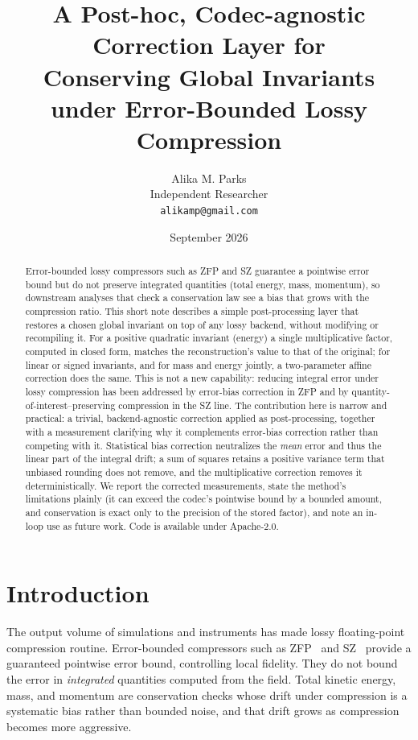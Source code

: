 \documentclass[11pt]{article}
\title{A Post-hoc, Codec-agnostic Correction Layer for\\
Conserving Global Invariants under Error-Bounded Lossy Compression}
\author{Alika M. Parks\\
\small Independent Researcher \\
\small \texttt{alikamp@gmail.com}}
\date{September 2026}
\begin{document}
\maketitle

\begin{abstract}
Error-bounded lossy compressors such as ZFP and SZ guarantee a pointwise error
bound but do not preserve integrated quantities (total energy, mass, momentum),
so downstream analyses that check a conservation law see a bias that grows with
the compression ratio. This short note describes a simple post-processing layer
that restores a chosen global invariant on top of any lossy backend, without
modifying or recompiling it. For a positive quadratic invariant (energy) a
single multiplicative factor, computed in closed form, matches the
reconstruction's value to that of the original; for linear or signed invariants,
and for mass and energy jointly, a two-parameter affine correction does the
same. This is not a new capability: reducing integral error under lossy
compression has been addressed by error-bias correction in ZFP and by
quantity-of-interest--preserving compression in the SZ line. The contribution
here is narrow and practical: a trivial, backend-agnostic correction applied as
post-processing, together with a measurement clarifying why it complements
error-bias correction rather than competing with it. Statistical bias
correction neutralizes the \emph{mean} error and thus the linear part of the
integral drift; a sum of squares retains a positive variance term that unbiased
rounding does not remove, and the multiplicative correction removes it
deterministically. We report the corrected measurements, state the method's
limitations plainly (it can exceed the codec's pointwise bound by a bounded
amount, and conservation is exact only to the precision of the stored factor),
and note an in-loop use as future work. Code is available under Apache-2.0.
\end{abstract}

\section{Introduction}
The output volume of simulations and instruments has made lossy floating-point
compression routine. Error-bounded compressors such as ZFP~\cite{zfp} and
SZ~\cite{sz} provide a guaranteed pointwise error bound, controlling local
fidelity. They do not bound the error in \emph{integrated} quantities computed
from the field. Total kinetic energy, mass, and momentum are conservation
checks whose drift under compression is a systematic bias rather than bounded
noise, and that drift grows as compression becomes more aggressive.
\end{document}

